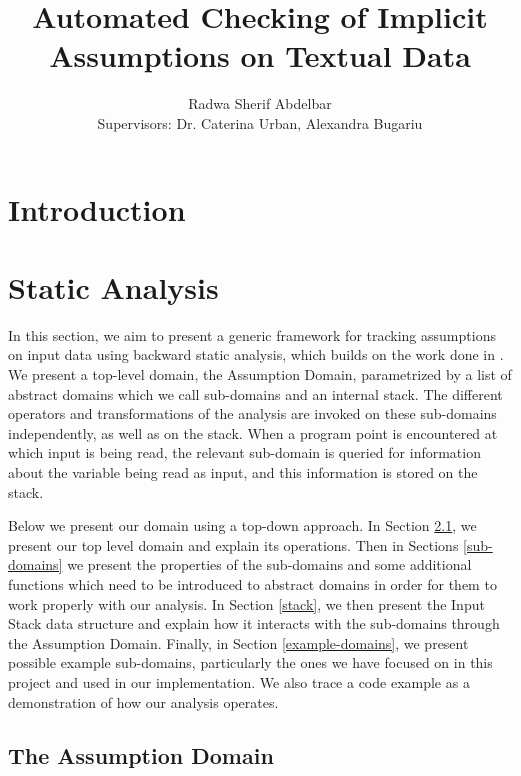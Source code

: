 \documentclass[]{article}
\title{Automated Checking of Implicit Assumptions on Textual Data}
\author{Radwa Sherif Abdelbar \\
	 Supervisors: Dr. Caterina Urban, Alexandra Bugariu}
\begin{document}
\maketitle



\begin{abstract}

\end{abstract}

\section{Introduction}

\section{Static Analysis}

In this section, we aim to present a generic framework for tracking assumptions on input data using backward static analysis, which builds on the work done in \cite{madelin}. We present a top-level domain, the Assumption Domain, parametrized by a list of abstract domains which we call sub-domains and an internal stack. The different operators and transformations of the analysis are invoked on these sub-domains independently, as well as on the stack. When a program point is encountered at which input is being read, the relevant sub-domain is queried for information about the variable being read as input, and this information is stored on the stack.

Below we present our domain using a top-down approach. In Section \ref{assumption-domain}, we present our top level domain and explain its operations. Then in Sections \ref{sub-domains} we present the properties of the sub-domains and some additional functions which need to be introduced to abstract domains in order for them to work properly with our analysis. In Section \ref{stack}, we then present the Input Stack data structure and explain how it interacts with the sub-domains through the Assumption Domain. Finally, in Section \ref{example-domains}, we present possible example sub-domains, particularly the ones we have focused on in this project and used in our implementation. We also trace a code example as a demonstration of how our analysis operates. 

\subsection{The Assumption Domain} \label{assumption-domain}
\end{document}
